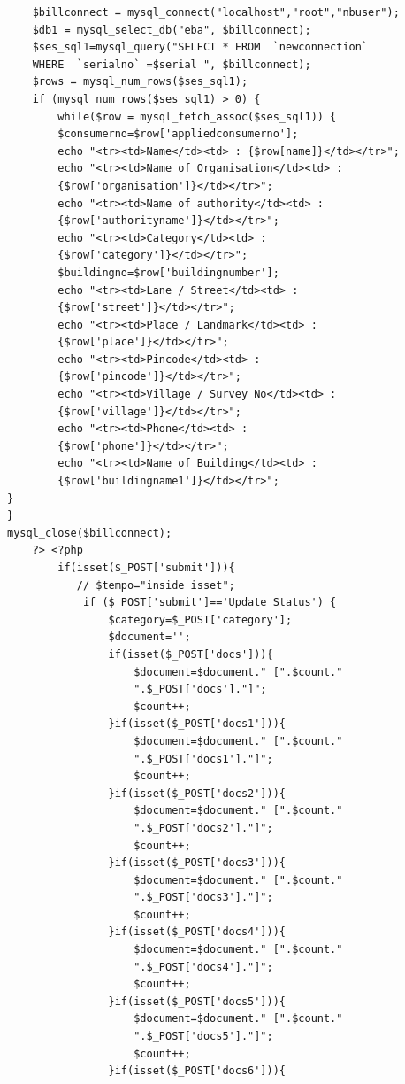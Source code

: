 \documentclass[12pt,a4paper,oneside]{report}
\begin{document}
\begin{lstlisting}
    $billconnect = mysql_connect("localhost","root","nbuser");
    $db1 = mysql_select_db("eba", $billconnect);
    $ses_sql1=mysql_query("SELECT * FROM  `newconnection` 
    WHERE  `serialno` =$serial ", $billconnect);
    $rows = mysql_num_rows($ses_sql1);
    if (mysql_num_rows($ses_sql1) > 0) {
        while($row = mysql_fetch_assoc($ses_sql1)) {
        $consumerno=$row['appliedconsumerno'];
        echo "<tr><td>Name</td><td> : {$row[name]}</td></tr>";
        echo "<tr><td>Name of Organisation</td><td> : 
        {$row['organisation']}</td></tr>";
        echo "<tr><td>Name of authority</td><td> : 
        {$row['authorityname']}</td></tr>";
        echo "<tr><td>Category</td><td> : 
        {$row['category']}</td></tr>";
        $buildingno=$row['buildingnumber'];
        echo "<tr><td>Lane / Street</td><td> : 
        {$row['street']}</td></tr>";
        echo "<tr><td>Place / Landmark</td><td> : 
        {$row['place']}</td></tr>";
        echo "<tr><td>Pincode</td><td> : 
        {$row['pincode']}</td></tr>";
        echo "<tr><td>Village / Survey No</td><td> : 
        {$row['village']}</td></tr>";
        echo "<tr><td>Phone</td><td> : 
        {$row['phone']}</td></tr>";   
        echo "<tr><td>Name of Building</td><td> : 
        {$row['buildingname1']}</td></tr>";    
}
}
mysql_close($billconnect);
    ?> <?php
        if(isset($_POST['submit'])){
           // $tempo="inside isset";
            if ($_POST['submit']=='Update Status') {
                $category=$_POST['category'];
                $document='';
                if(isset($_POST['docs'])){
                    $document=$document." [".$count." 
                    ".$_POST['docs']."]";
                    $count++;
                }if(isset($_POST['docs1'])){
                    $document=$document." [".$count." 
                    ".$_POST['docs1']."]";
                    $count++;
                }if(isset($_POST['docs2'])){
                    $document=$document." [".$count." 
                    ".$_POST['docs2']."]";
                    $count++;
                }if(isset($_POST['docs3'])){
                    $document=$document." [".$count." 
                    ".$_POST['docs3']."]";
                    $count++;
                }if(isset($_POST['docs4'])){
                    $document=$document." [".$count." 
                    ".$_POST['docs4']."]";
                    $count++;
                }if(isset($_POST['docs5'])){
                    $document=$document." [".$count." 
                    ".$_POST['docs5']."]";
                    $count++;
                }if(isset($_POST['docs6'])){

\end{lstlisting}
\end{document}
